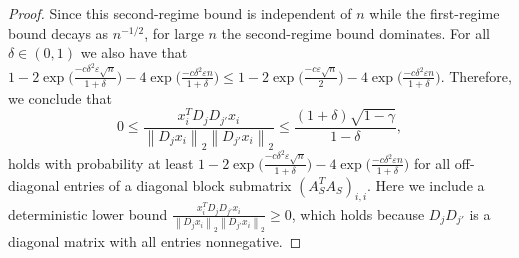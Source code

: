\documentclass{article} %
\newcommand{\twonorm}[1]{\left\|#1\right\|_{2}}
\newcommand{\n}{\ensuremath{n}}
\newcommand{\1}{\ensuremath{{\sf (i)}}}
\newcommand{\2}{\ensuremath{{\sf (ii)}}}
\newcommand{\3}{\ensuremath{{\sf (iii)}}}
\newcommand{\4}{\ensuremath{{\sf (iv)}}}
\newcommand{\5}{\ensuremath{{\sf (v)}}}
\newcommand{\6}{\ensuremath{{\sf (vi)}}}
\begin{document}
\begin{proof}
Since this second-regime bound is independent of $\n$ while the first-regime bound decays as $\n^{-1/2}$, for large $\n$ the second-regime bound dominates. For all $\delta \in (0,1)$ we also have that $1 - 2\exp{\big(\frac{-c\delta^2\varepsilon\sqrt{\n}}{1+\delta}\big)} - 4\exp{\big(\frac{-c\delta^2\varepsilon\n}{1+\delta}\big)} \leq 1 - 2\exp{\big(\frac{-c\varepsilon\sqrt{\n}}{2}\big)} - 4\exp{\big(\frac{-c\delta^2\varepsilon \n}{1+\delta}\big)} $. Therefore, we conclude that 
\begin{equation*}
0 \leq \frac{x_i^TD_jD_{j'}x_i}{\twonorm{D_jx_i}\twonorm{D_{j'}x_i}} \leq \frac{(1+\delta)\sqrt{1-\gamma}}{1-\delta} ,
\end{equation*}
holds with probability at least $1 - 2\exp{\big(\frac{-c\delta^2\varepsilon\sqrt{\n}}{1+\delta}\big)} - 4\exp{\big(\frac{-c\delta^2\varepsilon\n}{1+\delta}\big)}$ for all off-diagonal entries of a diagonal block submatrix $(A_S^TA_S)_{i,i}$. Here we include a deterministic lower bound $\frac{x_i^TD_jD_{j'}x_i}{\twonorm{D_jx_i}\twonorm{D_{j'}x_i}} \geq 0$, which holds because $D_jD_{j'}$ is a diagonal matrix with all entries nonnegative.


\end{proof}
\end{document}
